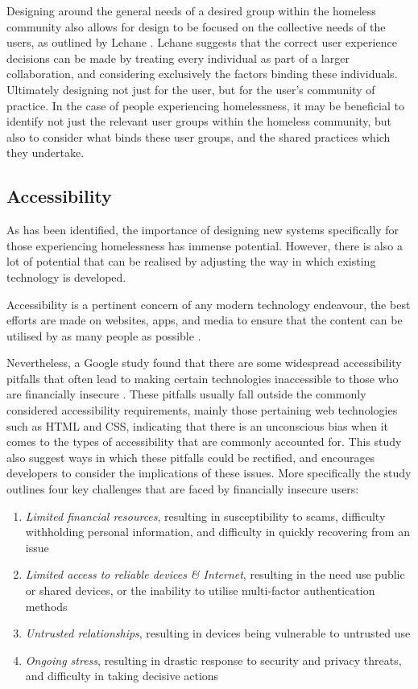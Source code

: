 Designing around the general needs of a desired group within the homeless community also allows for design to be focused on the collective needs of the users, as outlined by Lehane \cite{lehane2010designing}. Lehane suggests that the correct user experience decisions can be made by treating every individual as part of a larger collaboration, and considering exclusively the factors binding these individuals. Ultimately designing not just for the user, but for the user's community of practice. In the case of people experiencing homelessness, it may be beneficial to identify not just the relevant user groups within the homeless community, but also to consider what binds these user groups, and the shared practices which they undertake.

\subsection{Accessibility}

As has been identified, the importance of designing new systems specifically for those experiencing homelessness has immense potential. However, there is also a lot of potential that can be realised by adjusting the way in which existing technology is developed.

Accessibility is a pertinent concern of any modern technology endeavour, the best efforts are made on websites, apps, and media to ensure that the content can be utilised by as many people as possible \cite{henry2014accessibility} \cite{brophy2007web}.

Nevertheless, a Google study found that there are some widespread accessibility pitfalls that often lead to making certain technologies inaccessible to those who are financially insecure \cite{sleeper2019tough}. These pitfalls usually fall outside the commonly considered accessibility requirements, mainly those pertaining web technologies such as HTML and CSS, indicating that there is an unconscious bias when it comes to the types of accessibility that are commonly accounted for. This study also suggest ways in which these pitfalls could be rectified, and encourages developers to consider the implications of these issues. More specifically the study outlines four key challenges that are faced by financially insecure users:

\begin{enumerate}
    \item \emph{Limited financial resources}, resulting in susceptibility to scams, difficulty withholding personal information, and difficulty in quickly recovering from an issue
    \item \emph{Limited access to reliable devices \& Internet}, resulting in the need use public or shared devices, or the inability to utilise multi-factor authentication methods
    \item \emph{Untrusted relationships}, resulting in devices being vulnerable to untrusted use
    \item \emph{Ongoing stress}, resulting in drastic response to security and privacy threats, and difficulty in taking decisive actions
\end{enumerate}

